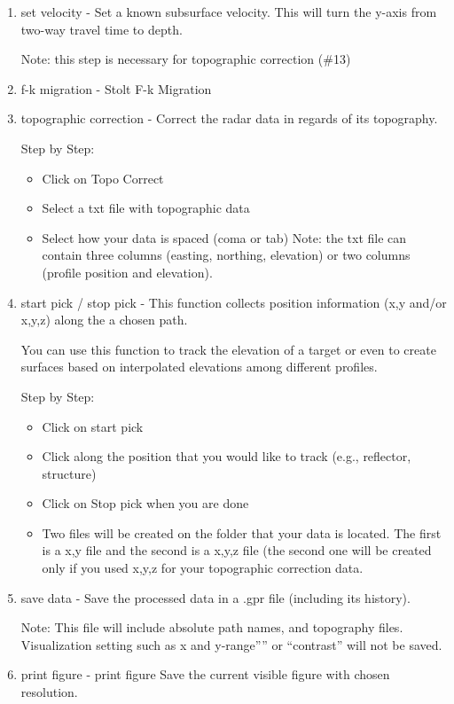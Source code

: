 \documentclass[12pt]{article}
\begin{document}
\begin{enumerate}
\item set velocity - Set a known subsurface velocity. This will turn the y-axis from two-way travel time to depth.

Note: this step is necessary for topographic correction (\#13)

\item f-k migration - Stolt F-k Migration  

\item topographic correction - Correct the radar data in regards of its topography. 

Step by Step:
\begin{itemize}
\item Click on Topo Correct
\item Select a txt file with topographic data
\item Select how your data is spaced (coma or tab)
Note: the txt file can contain three columns (easting, northing, elevation) or two columns (profile position and elevation). 
\end{itemize}


\item start pick / stop pick - This function collects position information (x,y and/or x,y,z) along the a chosen path. 

You can use this function to track the elevation of a target or even to create surfaces based on interpolated elevations among different profiles.

Step by Step:
\begin{itemize}
\item Click on start pick 
\item Click along the position that you would like to track (e.g., reflector, structure)
\item Click on Stop pick when you are done
\item Two files will be created on the folder that your data is located. The first is a x,y file and the second is a x,y,z file (the second one will be created only if you used x,y,z for your topographic correction data. 
\end{itemize}

\item save data - Save the processed data in a .gpr file (including its history). 

Note: This file will include absolute path names, and topography files.
Visualization setting such as x and y-range”” or “contrast” will not be saved.


\item print figure - print figure	Save the current visible figure with chosen resolution. 


\end{enumerate}
\end{document}

